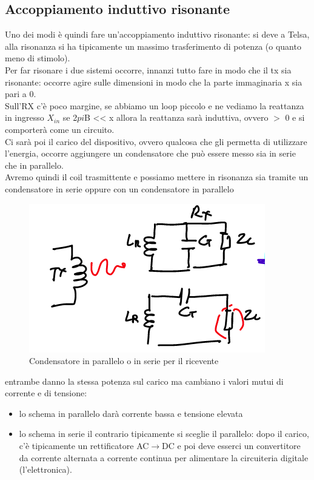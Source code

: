 \documentclass[oneside, 12pt]{extbook}
\begin{document}
\subsection{Accoppiamento induttivo risonante}
Uno dei modi è quindi fare un'accoppiamento induttivo risonante: si deve a Telsa, alla risonanza si ha tipicamente un massimo trasferimento di potenza (o quanto meno di stimolo).\\Per far risonare i due sistemi occorre, innanzi tutto fare in modo che il tx sia risonante: occorre agire sulle dimensioni in modo che la parte immaginaria x sia pari a 0.\\Sull'RX c'è poco margine, se abbiamo un loop piccolo e ne vediamo la reattanza in ingresso $X_{in}$ se 2$pi$B << x allora la reattanza sarà induttiva, ovvero $>$ 0 e si comporterà come un circuito.\\Ci sarà poi il carico del dispositivo, ovvero qualcosa che gli permetta di utilizzare l'energia, occorre aggiungere un condensatore che può essere messo sia in serie che in parallelo.\\Avremo quindi il coil trasmittente e possiamo mettere in risonanza sia tramite un condensatore in serie oppure con un condensatore in parallelo 
\begin{figure}[!h]
	\includegraphics[scale=0.7]{immagini/cond_ser_parall.png}
	\caption{Condensatore in parallelo o in serie per il ricevente}
\end{figure}
 entrambe danno la stessa potenza sul carico ma cambiano i valori mutui di corrente e di tensione:
 \begin{itemize}
 	\item lo schema in parallelo darà corrente bassa e tensione elevata
 	\item lo schema in serie il contrario
 	tipicamente si sceglie il parallelo: dopo il carico, c'è tipicamente un rettificatore AC$\rightarrow$DC e poi deve esserci un convertitore da corrente alternata a corrente continua per alimentare la circuiteria digitale (l'elettronica).
 \end{itemize}
\end{document}
